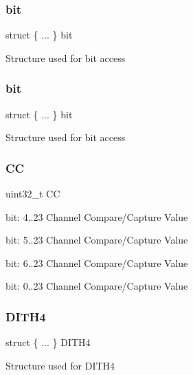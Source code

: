 \subsubsection{\texorpdfstring{bit}{bit}\hspace{0.1cm}{\footnotesize\ttfamily [1/2]}}
{\footnotesize\ttfamily struct \{ ... \}   bit}

Structure used for bit access \mbox{\label{union_t_c_c___c_c___type_a8eafb0672ade89226d777e71f8839ebf}} 
\subsubsection{\texorpdfstring{bit}{bit}\hspace{0.1cm}{\footnotesize\ttfamily [2/2]}}
{\footnotesize\ttfamily struct \{ ... \}   bit}

Structure used for bit access \mbox{\label{union_t_c_c___c_c___type_a10f2b0518af5a37e14c710d230272d1d}} 
\subsubsection{\texorpdfstring{CC}{CC}}
{\footnotesize\ttfamily uint32\+\_\+t CC}

bit\+: 4..23 Channel Compare/\+Capture Value

bit\+: 5..23 Channel Compare/\+Capture Value

bit\+: 6..23 Channel Compare/\+Capture Value

bit\+: 0..23 Channel Compare/\+Capture Value \mbox{\label{union_t_c_c___c_c___type_adeba68363c81bde605f391e07458b2a8}} 
\subsubsection{\texorpdfstring{DITH4}{DITH4}\hspace{0.1cm}{\footnotesize\ttfamily [1/2]}}
{\footnotesize\ttfamily struct \{ ... \}   D\+I\+T\+H4}

Structure used for D\+I\+T\+H4 \mbox{\label{union_t_c_c___c_c___type_a7b1ef160b7724ed6570191a16b6206e4}} 

